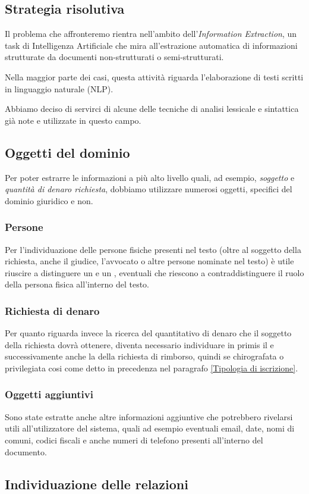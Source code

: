 \subsection{Strategia risolutiva}
Il problema che affronteremo rientra nell'ambito dell'\emph{Information Extraction}, un task di Intelligenza Artificiale che mira all'estrazione automatica di informazioni strutturate da documenti non-strutturati o semi-strutturati.

Nella maggior parte dei casi, questa attività riguarda l'elaborazione di testi scritti in linguaggio naturale (NLP).

Abbiamo deciso di servirci di alcune delle tecniche di analisi lessicale e sintattica già note e utilizzate in questo campo.

\subsection{Oggetti del dominio}
Per poter estrarre le informazioni a più alto livello quali, ad esempio, \emph{soggetto} e \emph{quantità di denaro richiesta}, dobbiamo utilizzare numerosi oggetti, specifici del dominio giuridico e non.

\subsubsection{Persone}
Per l'individuazione delle persone fisiche presenti nel testo (oltre al soggetto della richiesta, anche il giudice, l'avvocato o altre persone nominate nel testo) è utile riuscire a distinguere un  e un , eventuali  che riescono a contraddistinguere il ruolo della persona fisica all'interno del testo.

\subsubsection{Richiesta di denaro}
Per quanto riguarda invece la ricerca del quantitativo di denaro che il soggetto della richiesta dovrà ottenere, diventa necessario individuare in primis il  e successivamente anche la  della richiesta di rimborso, quindi se chirografata o privilegiata cosi come detto in precedenza nel paragrafo \ref{Tipologia di iscrizione}.

\subsubsection{Oggetti aggiuntivi}
Sono state estratte anche altre informazioni aggiuntive che potrebbero rivelarsi utili all'utilizzatore del sistema, quali ad esempio eventuali email, date, nomi di comuni, codici fiscali e anche numeri di telefono presenti all'interno del documento.

\subsection{Individuazione delle relazioni}
